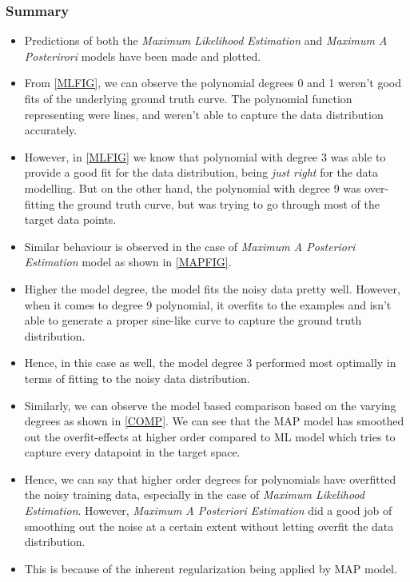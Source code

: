\documentclass[12pt,twoside,a4paper]{article}
\begin{document}
\subsubsection{Summary}
\begin{itemize}
    \item Predictions of both the \textit{Maximum Likelihood Estimation} and \textit{Maximum A Posterirori} models have been made and plotted.
    \item From \ref{MLFIG}, we can observe the polynomial degrees 0 and 1 weren't good fits of the underlying ground truth curve. The polynomial function representing were lines, and weren't able to capture the data distribution accurately.
    \item However, in \ref{MLFIG} we know that polynomial with degree 3 was able to provide a good fit for the data distribution, being \textit{just right} for the data modelling. But on the other hand, the polynomial with degree 9 was over-fitting the ground truth curve, but was trying to go through most of the target data points.
    \item Similar behaviour is observed in the case of \textit{Maximum A Posteriori Estimation} model as shown in \ref{MAPFIG}.
    \item Higher the model degree, the model fits the noisy data pretty well. However, when it comes to degree 9 polynomial, it overfits to the examples and isn't able to generate a proper sine-like curve to capture the ground truth distribution.
    \item Hence, in this case as well, the model degree 3 performed most optimally in terms of fitting to the noisy data distribution.
    \item Similarly, we can observe the model based comparison based on the varying degrees as shown in \ref{COMP}. We can see that the MAP model has smoothed out the overfit-effects at higher order compared to ML model which tries to capture every datapoint in the target space.
    \item Hence, we can say that higher order degrees for polynomials have overfitted the noisy training data, especially in the case of \textit{Maximum Likelihood Estimation}. However, \textit{Maximum A Posteriori Estimation} did a good job of smoothing out the noise at a certain extent without letting overfit the data distribution.
    \item This is because of the inherent regularization being applied by MAP model.
\end{itemize}
\end{document}
